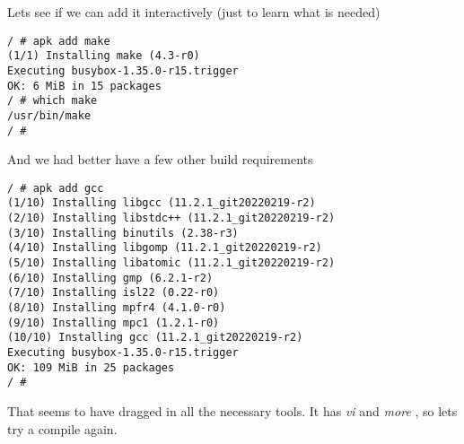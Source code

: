 \documentclass{article}  %
\begin{document}
Lets see if we can add it interactively (just to learn what is needed)
\begin{verbatim}
/ # apk add make
(1/1) Installing make (4.3-r0)
Executing busybox-1.35.0-r15.trigger
OK: 6 MiB in 15 packages
/ # which make
/usr/bin/make
/ # 
\end{verbatim}
And we had better have a few other build requirements
\begin{verbatim}
/ # apk add gcc
(1/10) Installing libgcc (11.2.1_git20220219-r2)
(2/10) Installing libstdc++ (11.2.1_git20220219-r2)
(3/10) Installing binutils (2.38-r3)
(4/10) Installing libgomp (11.2.1_git20220219-r2)
(5/10) Installing libatomic (11.2.1_git20220219-r2)
(6/10) Installing gmp (6.2.1-r2)
(7/10) Installing isl22 (0.22-r0)
(8/10) Installing mpfr4 (4.1.0-r0)
(9/10) Installing mpc1 (1.2.1-r0)
(10/10) Installing gcc (11.2.1_git20220219-r2)
Executing busybox-1.35.0-r15.trigger
OK: 109 MiB in 25 packages
/ # 
\end{verbatim}
That seems to have dragged in all the necessary tools.
It has {\em vi} and {\em more} , so lets try a compile again.
\end{document}
